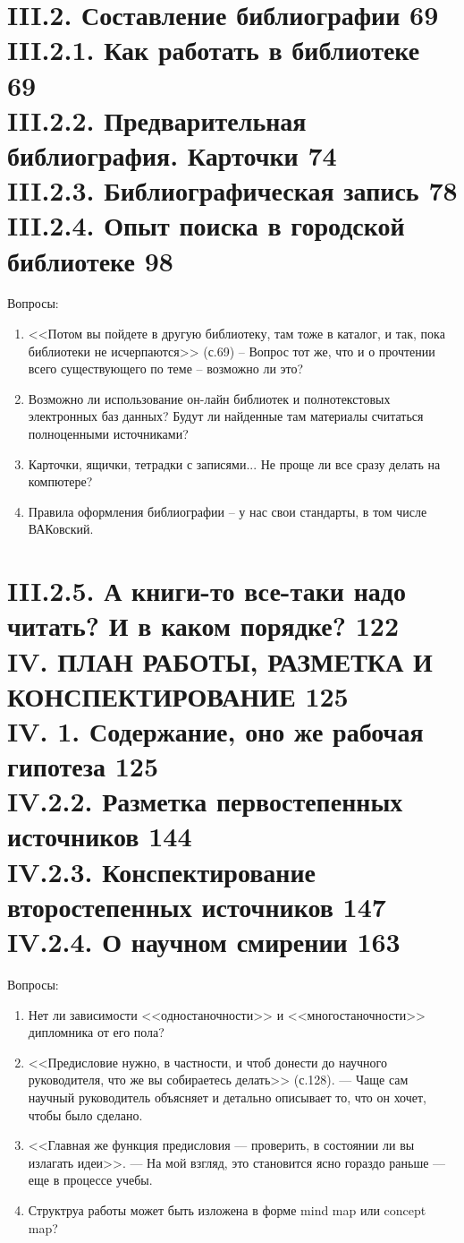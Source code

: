 \documentclass{../../common/thesisbyxetex}
\begin{document}
\section*{III.2. Составление библиографии 69 \\
III.2.1. Как работать в библиотеке 69 \\
III.2.2. Предварительная библиография. Карточки 74 \\
III.2.3. Библиографическая запись 78 \\
III.2.4. Опыт поиска в городской библиотеке 98}
Вопросы:
\begin{enumerate}
\item <<Потом вы пойдете в другую библиотеку, там тоже в каталог, и так, пока библиотеки не исчерпаются>> (с.69) –
Вопрос тот  же, что и о прочтении всего существующего по теме – возможно ли это?

\item Возможно ли использование он-лайн библиотек и полнотекстовых электронных баз данных? Будут ли найденные там
материалы считаться полноценными источниками?

\item Карточки, ящички, тетрадки с записями... Не проще ли все сразу делать на компютере?

\item Правила оформления библиографии – у нас свои стандарты, в том числе ВАКовский.
\end{enumerate}

\section*{III.2.5. А книги-то все-таки надо читать? И в каком порядке? 122 \\
IV. \uppercase{План работы, разметка и конспектирование} 125 \\
IV. 1. Содержание, оно же рабочая гипотеза 125 \\
IV.2.2. Разметка первостепенных источников 144 \\
IV.2.3. Конспектирование второстепенных источников 147 \\
IV.2.4. О научном смирении 163}
Вопросы:
\begin{enumerate}
\item Нет ли зависимости <<одностаночности>> и <<многостаночности>> дипломника от его пола?

\item  <<Предисловие нужно, в частности, и чтоб донести до научного
руководителя, что же вы собираетесь делать>> (с.128). --- Чаще сам научный руководитель объясняет и детально описывает
то, что он хочет, чтобы было сделано.

\item <<Главная же функция предисловия --- проверить, в состоянии ли вы излагать идеи>>. --- На мой взгляд, это
становится ясно гораздо раньше --- еще в процессе учебы.

\item Структруа работы может быть изложена в форме mind map или concept map?
\end{enumerate}
\end{document}
